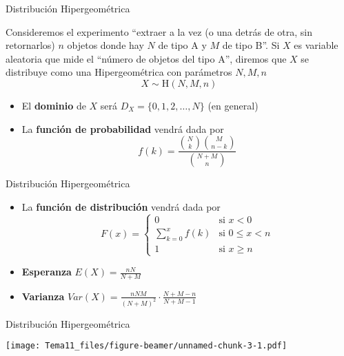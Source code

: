 \documentclass[
  ignorenonframetext,
]{beamer}
\providecommand{\tightlist}{%
  \setlength{\itemsep}{0pt}\setlength{\parskip}{0pt}}
\begin{document}
\begin{frame}{Distribución Hipergeométrica}
\protect\hypertarget{distribuciuxf3n-hipergeomuxe9trica}{}

Consideremos el experimento ``extraer a la vez (o una detrás de otra,
sin retornarlos) \(n\) objetos donde hay \(N\) de tipo A y \(M\) de tipo
B''. Si \(X\) es variable aleatoria que mide el ``número de objetos del
tipo A'', diremos que \(X\) se distribuye como una Hipergeométrica con
parámetros \(N,M,n\) \[X\sim \text{H}(N,M,n)\]

\begin{itemize}
\tightlist
\item
  El \textbf{dominio} de \(X\) será \(D_X = \{0,1,2,\dots,N\}\) (en
  general)
\item
  La \textbf{función de probabilidad} vendrá dada por
  \[f(k) = \frac{{N\choose k}{M\choose n-k}}{N+M\choose n}\]
\end{itemize}

\end{frame}

\begin{frame}{Distribución Hipergeométrica}
\protect\hypertarget{distribuciuxf3n-hipergeomuxe9trica-1}{}

\begin{itemize}
\tightlist
\item
  La \textbf{función de distribución} vendrá dada por \[F(x) = \left\{
  \begin{array}{cl}
     0 & \text{si } x<0 
  \\ \sum_{k=0}^xf(k) & \text{si } 0\le x<n
  \\ 1 & \text{si } x\ge n
  \end{array}
  \right.\]
\item
  \textbf{Esperanza} \(E(X) = \frac{nN}{N+M}\)
\item
  \textbf{Varianza}
  \(Var(X) = \frac{nNM}{(N+M)^2}\cdot\frac{N+M-n}{N+M-1}\)
\end{itemize}

\end{frame}

\begin{frame}{Distribución Hipergeométrica}
\protect\hypertarget{distribuciuxf3n-hipergeomuxe9trica-2}{}

\texttt{[image: Tema11\_files/figure-beamer/unnamed-chunk-3-1.pdf]}

\end{frame}
\end{document}
